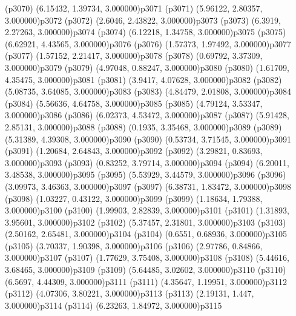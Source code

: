 \psdot(p3070)
\psPoint(6.15432, 1.39734, 3.000000){p3071}
\psdot(p3071)
\psPoint(5.96122, 2.80357, 3.000000){p3072}
\psdot(p3072)
\psPoint(2.6046, 2.43822, 3.000000){p3073}
\psdot(p3073)
\psPoint(6.3919, 2.27263, 3.000000){p3074}
\psdot(p3074)
\psPoint(6.12218, 1.34758, 3.000000){p3075}
\psdot(p3075)
\psPoint(6.62921, 4.43565, 3.000000){p3076}
\psdot(p3076)
\psPoint(1.57373, 1.97492, 3.000000){p3077}
\psdot(p3077)
\psPoint(1.57152, 2.21417, 3.000000){p3078}
\psdot(p3078)
\psPoint(0.69792, 3.37309, 3.000000){p3079}
\psdot(p3079)
\psPoint(4.97048, 0.88247, 3.000000){p3080}
\psdot(p3080)
\psPoint(1.61709, 4.35475, 3.000000){p3081}
\psdot(p3081)
\psPoint(3.9417, 4.07628, 3.000000){p3082}
\psdot(p3082)
\psPoint(5.08735, 3.64085, 3.000000){p3083}
\psdot(p3083)
\psPoint(4.84479, 2.01808, 3.000000){p3084}
\psdot(p3084)
\psPoint(5.56636, 4.64758, 3.000000){p3085}
\psdot(p3085)
\psPoint(4.79124, 3.53347, 3.000000){p3086}
\psdot(p3086)
\psPoint(6.02373, 4.53472, 3.000000){p3087}
\psdot(p3087)
\psPoint(5.91428, 2.85131, 3.000000){p3088}
\psdot(p3088)
\psPoint(0.1935, 3.35468, 3.000000){p3089}
\psdot(p3089)
\psPoint(5.31389, 4.39308, 3.000000){p3090}
\psdot(p3090)
\psPoint(0.53734, 3.71545, 3.000000){p3091}
\psdot(p3091)
\psPoint(1.20684, 2.64843, 3.000000){p3092}
\psdot(p3092)
\psPoint(3.29821, 0.83693, 3.000000){p3093}
\psdot(p3093)
\psPoint(0.83252, 3.79714, 3.000000){p3094}
\psdot(p3094)
\psPoint(6.20011, 3.48538, 3.000000){p3095}
\psdot(p3095)
\psPoint(5.53929, 3.44579, 3.000000){p3096}
\psdot(p3096)
\psPoint(3.09973, 3.46363, 3.000000){p3097}
\psdot(p3097)
\psPoint(6.38731, 1.83472, 3.000000){p3098}
\psdot(p3098)
\psPoint(1.03227, 0.43122, 3.000000){p3099}
\psdot(p3099)
\psPoint(1.18634, 1.79388, 3.000000){p3100}
\psdot(p3100)
\psPoint(1.99903, 2.82839, 3.000000){p3101}
\psdot(p3101)
\psPoint(1.31893, 3.95601, 3.000000){p3102}
\psdot(p3102)
\psPoint(5.37457, 2.31801, 3.000000){p3103}
\psdot(p3103)
\psPoint(2.50162, 2.65481, 3.000000){p3104}
\psdot(p3104)
\psPoint(0.6551, 0.68936, 3.000000){p3105}
\psdot(p3105)
\psPoint(3.70337, 1.90398, 3.000000){p3106}
\psdot(p3106)
\psPoint(2.97786, 0.84866, 3.000000){p3107}
\psdot(p3107)
\psPoint(1.77629, 3.75408, 3.000000){p3108}
\psdot(p3108)
\psPoint(5.44616, 3.68465, 3.000000){p3109}
\psdot(p3109)
\psPoint(5.64485, 3.02602, 3.000000){p3110}
\psdot(p3110)
\psPoint(6.5697, 4.44309, 3.000000){p3111}
\psdot(p3111)
\psPoint(4.35647, 1.19951, 3.000000){p3112}
\psdot(p3112)
\psPoint(4.07306, 3.80221, 3.000000){p3113}
\psdot(p3113)
\psPoint(2.19131, 1.447, 3.000000){p3114}
\psdot(p3114)
\psPoint(6.23263, 1.84972, 3.000000){p3115}
